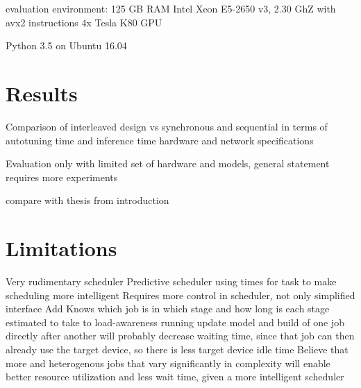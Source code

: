 evaluation environment:
125 GB RAM
Intel Xeon E5-2650 v3, 2.30 GhZ with avx2 instructions
4x Tesla K80 GPU

Python 3.5
on Ubuntu 16.04

\section{Results}
Comparison of interleaved design vs synchronous and sequential in terms of autotuning time and inference time
hardware and network specifications

Evaluation only with limited set of hardware and models, general statement requires more experiments

compare with thesis from introduction

\section{Limitations}
Very rudimentary scheduler
Predictive scheduler using times for task to make scheduling more intelligent
Requires more control in scheduler, not only simplified interface
Add Knows which job is in which stage and how long is each stage estimated to take to load-awareness
running update model and build of one job directly after another will probably decrease waiting time, since that job can then already use the target device, so there is less target device idle time
Believe that more and heterogenous jobs that vary significantly in complexity will enable better resource utilization and less wait time, given a more intelligent scheduler